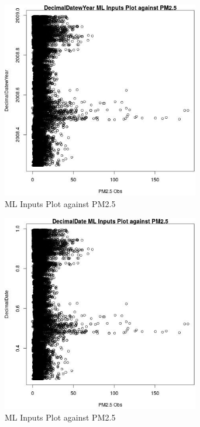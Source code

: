 \begin{figure} 
\centering  
\includegraphics[width=0.77\textwidth]{Code_Outputs/Report_ML_input_PM25_Step4_part_e_de_duplicated_aves_DecimalDatewYearvPM25_Obs.jpg} 
\caption{\label{fig:Report_ML_input_PM25_Step4_part_e_de_duplicated_avesDecimalDatewYearvPM25_Obs}ML Inputs Plot against PM2.5} 
\end{figure} 
 

\begin{figure} 
\centering  
\includegraphics[width=0.77\textwidth]{Code_Outputs/Report_ML_input_PM25_Step4_part_e_de_duplicated_aves_DecimalDatevPM25_Obs.jpg} 
\caption{\label{fig:Report_ML_input_PM25_Step4_part_e_de_duplicated_avesDecimalDatevPM25_Obs}ML Inputs Plot against PM2.5} 
\end{figure} 
 
